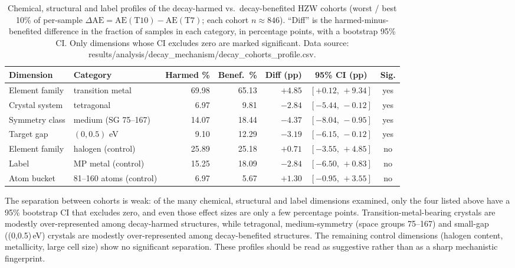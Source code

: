 \documentclass[a4paper,10pt]{article}
\begin{document}
\begin{table}[htbp]
\centering
\caption{Chemical, structural and label profiles of the decay-harmed vs.\ decay-benefited HZW cohorts (worst / best 10\% of per-sample \(\Delta\mathrm{AE}=\mathrm{AE}(\mathrm{T10})-\mathrm{AE}(\mathrm{T7})\); each cohort \(n\approx846\)). ``Diff'' is the harmed-minus-benefited difference in the fraction of samples in each category, in percentage points, with a bootstrap 95\% CI. Only dimensions whose CI excludes zero are marked significant. Data source: \textnormal{results/analysis/decay\_mechanism/decay\_cohorts\_profile.csv}.}
\label{tab:decay-cohorts}
\small
\begin{tabular}{l l r r r c c}
\toprule
Dimension & Category & Harmed \% & Benef.\ \% & Diff (pp) & 95\% CI (pp) & Sig. \\
\midrule
Element family  & transition metal        & 69.98 & 65.13 & \(+4.85\) & \([+0.12,\,+9.34]\) & yes \\
Crystal system  & tetragonal              &  6.97 &  9.81 & \(-2.84\) & \([-5.44,\,-0.12]\) & yes \\
Symmetry class  & medium (SG 75--167)     & 14.07 & 18.44 & \(-4.37\) & \([-8.04,\,-0.95]\) & yes \\
Target gap      & \((0,0.5)\) eV          &  9.10 & 12.29 & \(-3.19\) & \([-6.15,\,-0.12]\) & yes \\
\midrule
Element family  & halogen (control)       & 25.89 & 25.18 & \(+0.71\) & \([-3.55,\,+4.85]\) & no \\
Label           & MP metal (control)      & 15.25 & 18.09 & \(-2.84\) & \([-6.50,\,+0.83]\) & no \\
Atom bucket     & 81--160 atoms (control) &  6.97 &  5.67 & \(+1.30\) & \([-0.95,\,+3.55]\) & no \\
\bottomrule
\end{tabular}
\end{table}

The separation between cohorts is weak: of the many chemical, structural and label dimensions examined, only the four listed above have a 95\% bootstrap CI that excludes zero, and even those effect sizes are only a few percentage points. Transition-metal-bearing crystals are modestly over-represented among decay-harmed structures, while tetragonal, medium-symmetry (space groups 75--167) and small-gap ((0,0.5)\,eV) crystals are modestly over-represented among decay-benefited structures. The remaining control dimensions (halogen content, metallicity, large cell size) show no significant separation. These profiles should be read as suggestive rather than as a sharp mechanistic fingerprint.
\end{document}
